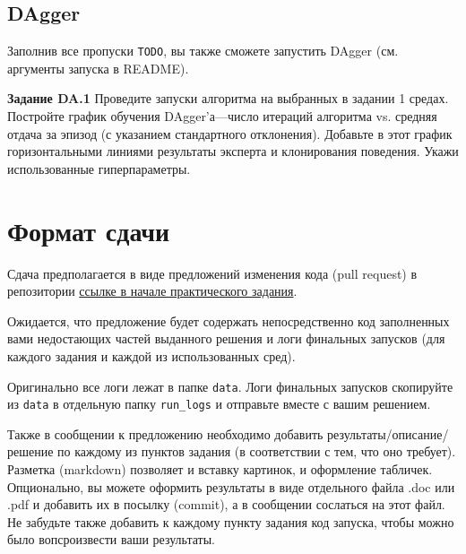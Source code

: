 \documentclass[12pt, oneside]{article}
\begin{document}
\subsection{DAgger}

Заполнив все пропуски \verb|TODO|, вы также сможете запустить DAgger (см. аргументы запуска в README).

\textbf{Задание DA.1} Проведите запуски алгоритма на выбранных в задании 1 средах. Постройте график обучения DAgger'а---число итераций алгоритма vs. средняя отдача за эпизод (с указанием стандартного отклонения). Добавьте в этот график горизонтальными линиями результаты эксперта и клонирования поведения. Укажи использованные гиперпараметры.

\section{Формат сдачи}

Сдача предполагается в виде предложений изменения кода (pull request) в репозитории \href{https://github.com/pkuderov/mipt-rl-hw-2022}{ссылке в начале практического задания}.

Ожидается, что предложение будет содержать непосредственно код заполненных вами недостающих частей выданного решения и логи финальных запусков (для каждого задания и каждой из использованных сред). 

Оригинально все логи лежат в папке \verb|data|. Логи финальных запусков скопируйте из \verb|data| в отдельную папку \verb|run_logs| и отправьте вместе с вашим решением.

Также в сообщении к предложению необходимо добавить результаты/описание/решение по каждому из пунктов задания (в соответствии с тем, что оно требует). Разметка (markdown) позволяет и вставку картинок, и оформление табличек. Опционально, вы можете оформить результаты в виде отдельного файла .doc или .pdf и добавить их в посылку (commit), а в сообщении сослаться на этот файл. Не забудьте также добавить к каждому пункту задания код запуска, чтобы можно было вопсроизвести ваши результаты.
\end{document}
